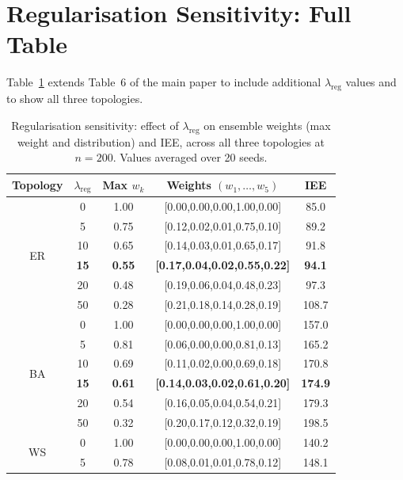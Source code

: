 \documentclass[review,12pt]{elsarticle}
\begin{document}
\section{Regularisation Sensitivity: Full Table}
\label{sec:S_reg}

Table~\ref{tab:S_reg_full} extends Table~6 of the main paper to include
additional $\lambda_{\mathrm{reg}}$ values and to show all three topologies.

\begin{table}[htbp]
  \caption{Regularisation sensitivity: effect of $\lambda_{\mathrm{reg}}$ on
           ensemble weights (max weight and distribution) and IEE, across
           all three topologies at $n=200$.  Values averaged over 20 seeds.}
  \label{tab:S_reg_full}
  \centering
  \small
  \renewcommand{\arraystretch}{1.15}
  \begin{tabular}{ccccc}
    \toprule
    Topology & $\lambda_{\mathrm{reg}}$ & Max $w_k$ & Weights $(w_1,\ldots,w_5)$ & IEE \\
    \midrule
    \multirow{6}{*}{ER}
      & 0   & 1.00 & [0.00,0.00,0.00,1.00,0.00] & 85.0 \\
      & 5   & 0.75 & [0.12,0.02,0.01,0.75,0.10] & 89.2 \\
      & 10  & 0.65 & [0.14,0.03,0.01,0.65,0.17] & 91.8 \\
      & \textbf{15} & \textbf{0.55} & \textbf{[0.17,0.04,0.02,0.55,0.22]} & \textbf{94.1} \\
      & 20  & 0.48 & [0.19,0.06,0.04,0.48,0.23] & 97.3 \\
      & 50  & 0.28 & [0.21,0.18,0.14,0.28,0.19] & 108.7 \\
    \midrule
    \multirow{6}{*}{BA}
      & 0   & 1.00 & [0.00,0.00,0.00,1.00,0.00] & 157.0 \\
      & 5   & 0.81 & [0.06,0.00,0.00,0.81,0.13] & 165.2 \\
      & 10  & 0.69 & [0.11,0.02,0.00,0.69,0.18] & 170.8 \\
      & \textbf{15} & \textbf{0.61} & \textbf{[0.14,0.03,0.02,0.61,0.20]} & \textbf{174.9} \\
      & 20  & 0.54 & [0.16,0.05,0.04,0.54,0.21] & 179.3 \\
      & 50  & 0.32 & [0.20,0.17,0.12,0.32,0.19] & 198.5 \\
    \midrule
    \multirow{6}{*}{WS}
      & 0   & 1.00 & [0.00,0.00,0.00,1.00,0.00] & 140.2 \\
      & 5   & 0.78 & [0.08,0.01,0.01,0.78,0.12] & 148.1 \\

\end{tabular}
\end{table}
\end{document}

